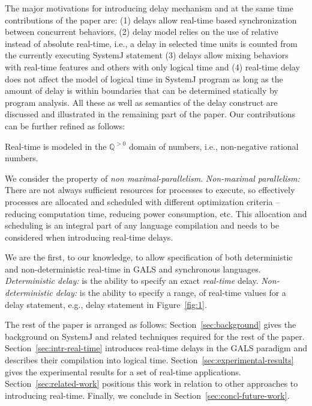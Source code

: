 The major motivations for introducing delay mechanism and at the same
time contributions of the paper are: (1) delays allow real-time based
synchronization between concurrent behaviors, (2) delay model relies on
the use of relative instead of absolute real-time, i.e., a delay in
selected time units is counted from the currently executing SystemJ
statement (3) delays allow mixing behaviors with real-time features and
others with only logical time and (4) real-time delay does not affect
the model of logical time in SystemJ program as long as the amount of
delay is within boundaries that can be determined statically by program
analysis. All these as well as semantics of the delay construct are
discussed and illustrated in the remaining part of the paper. Our
contributions can be further refined as follows:
\begin{enumerate*}
\item Real-time is modeled in the $\mathbb{Q}^{>0}$ domain of numbers,
 i.e., non-negative rational numbers.
\item We consider the property of \textit{non
    maximal-parallelism}. \textit{Non-maximal parallelism:} There are
  not always sufficient resources for processes to execute, so
  effectively processes are allocated and scheduled with different
  optimization criteria -- reducing computation time, reducing power
  consumption, etc. This allocation and scheduling is an integral part
  of any language compilation and needs to be considered when
  introducing real-time delays.
\item We are the first, to our knowledge, to allow specification of both
  deterministic and non-deterministic real-time in GALS and synchronous
  languages. \textit{Deterministic delay:} is the ability to specify an
  exact \textit{real-time} delay. \textit{Non-deterministic delay:} is
  the ability to specify a range, of real-time values for a delay
  statement, e.g., delay statement in Figure~\ref{fig:1}.
\end{enumerate*}

The rest of the paper is arranged as follows:
Section~\ref{sec:background} gives the background on SystemJ and related
techniques required for the rest of the
paper. Section~\ref{sec:intr-real-time} introduces real-time delays in
the GALS paradigm and describes their compilation into logical
time. Section~\ref{sec:experimental-results} gives the experimental
results for a set of real-time
applications. Section~\ref{sec:related-work} positions this work in
relation to other approaches to introducing real-time. Finally, we
conclude in Section~\ref{sec:concl-future-work}.


